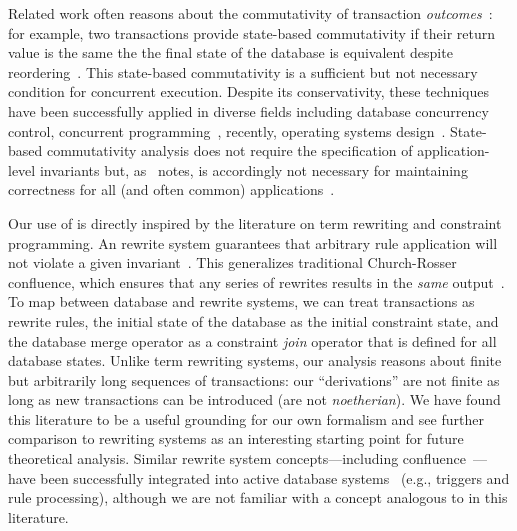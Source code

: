  Related work often reasons about
the commutativity of transaction \textit{outcomes}~\cite{boosting}:
for example, two transactions provide state-based commutativity if
their return value is the same the the final state of the database is
equivalent despite reordering~\cite{weihl-data,weihl-thesis}. This
state-based commutativity is a sufficient but not necessary condition
for concurrent execution. Despite its conservativity, these techniques
have been successfully applied in diverse fields including database
concurrency control, concurrent programming~\cite{boosting}, recently,
operating systems design~\cite{kohler-commutativity}. State-based
commutativity analysis does not require the specification of
application-level invariants but, as~\cite{kohler-commutativity}
notes, is accordingly not necessary for maintaining correctness for
all (and often common) applications~\cite{lamport-audit}.

 Our use of \iconfluence is directly inspired
by the literature on term rewriting and constraint programming. An
\iconfluent rewrite system guarantees that arbitrary rule application
will not violate a given invariant~\cite{obs-confluence}. This
generalizes traditional Church-Rosser confluence, which ensures that
any series of rewrites results in the \textit{same}
output~\cite{termrewriting}. To map between database and rewrite
systems, we can treat transactions as rewrite rules, the initial state
of the database as the initial constraint state, and the database
merge operator as a constraint \textit{join} operator that is defined
for all database states. Unlike term rewriting systems, our \cfreedom
analysis reasons about finite but arbitrarily long sequences of
transactions: our ``derivations'' are not finite as long as new
transactions can be introduced (are not \textit{noetherian}). We have
found this literature to be a useful grounding for our own formalism
and see further comparison to rewriting systems as an interesting
starting point for future theoretical analysis. Similar rewrite system
concepts---including confluence~\cite{aiken-confluence}---have been
successfully integrated into active database
systems~\cite{activedb-book} (e.g., triggers and rule processing),
although we are not familiar with a concept analogous to \iconfluence
in this literature.

